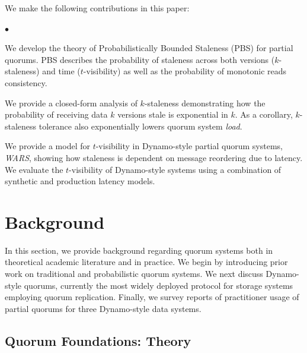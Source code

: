 \documentclass{vldb}
\newcommand{\sectionskip}{-0em}
\newcommand{\subsectionskip}{-0em}
\newenvironment{myitemize}
{
   \vspace{0em}
    \begin{list}{$\bullet$ }{}
        \setlength{\topsep}{0em}
        \setlength{\parskip}{0pt}
        \setlength{\partopsep}{0pt}
        \setlength{\parsep}{0pt}         
        \setlength{\itemsep}{.5em} 
}
{
    \end{list} 
    \vspace{-.5em}
}
\begin{document}
We make the following contributions in this paper:

\begin{myitemize}

\item We develop the theory of Probabilistically Bounded Staleness
  (PBS) for partial quorums. PBS describes the probability of
  staleness across both versions ($k$-staleness) and time
  ($t$-visibility) as well as the probability of monotonic reads
  consistency.

\item We provide a closed-form analysis of $k$-staleness demonstrating
  how the probability of receiving data $k$ versions stale is
  exponential in $k$.  As a corollary, $k$-staleness tolerance also
  exponentially lowers quorum system \textit{load}.

\item We provide a model for $t$-visibility in Dynamo-style partial
  quorum systems, \textit{WARS}, showing how staleness is dependent on
  message reordering due to latency.  We evaluate the $t$-visibility
  of Dynamo-style systems using a combination of synthetic and
  production latency models.

\end{myitemize}

\vspace{\sectionskip}\section{Background}
\label{sec:background}

In this section, we provide background regarding quorum systems both
in theoretical academic literature and in practice.  We begin by
introducing prior work on traditional and probabilistic quorum
systems.  We next discuss Dynamo-style quorums, currently the most
widely deployed protocol for storage systems employing quorum
replication.  Finally, we survey reports of practitioner usage of
partial quorums for three Dynamo-style data systems.

\vspace{\subsectionskip}\subsection{Quorum Foundations: Theory}
\end{document}
